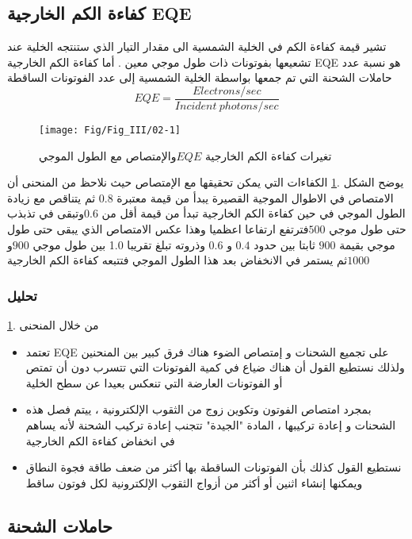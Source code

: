  \subsection{ كفاءة الكم الخارجية EQE }
 تشير قيمة كفاءة الكم في الخلية الشمسية الى مقدار التيار الذي ستنتجه الخلية عند تشعيعها بفوتونات ذات طول موجي معين . أما كفاءة الكم الخارجية  EQE هو نسبة عدد حاملات الشحنة التي تم جمعها بواسطة الخلية الشمسية إلى عدد الفوتونات الساقطة 
 \begin{equation}
 	 EQE=\frac{Electrons/sec}{Incident~ photons/sec}
 \end{equation}
 \begin{figure}[h!]
 	\centering
 	\texttt{[image: Fig/Fig\_III/02-1]}
 	\caption{تغيرات كفاءة الكم الخارجية $ EQE  $والإمتصاص مع الطول الموجي }
 	\label{fig:02-1}
 \end{figure}
 \FloatBarrier
 يوضح الشكل  .\ref{fig:02-1} الكفاءات التي يمكن تحقيقها مع الإمتصاص حيث نلاحظ من المنحنى أن الامتصاص في الاطوال الموجية القصيرة يبدأ من قيمة معتبرة $   0.8$ ثم يتناقص مع زيادة الطول الموجي في حين كفاءة الكم الخارجية تبدأ من قيمة أقل من $ 0.6  $وتبقى في تذبذب حتى طول موجي $ 500  $فترتفع ارتفاعا اعظميا وهذا عكس الامتصاص الذي يبقى حتى طول موجي بقيمة $ 900  $ ثابتا بين حدود  $ 0.4 $ و $ 0.6  $ وذروته تبلغ تقريبا 1.0 بين طول موجي $ 900  $و $ 1000  $ثم يستمر في الانخفاض بعد هذا الطول الموجي فتتبعه كفاءة الكم الخارجية  
 \subsubsection{  تحليل  }
  من خلال المنحنى  .\ref{fig:02-1}
 \begin{itemize}
 	\item      

 تعتمد EQE على تجميع الشحنات و إمتصاص الضوء هناك فرق كبير بين المنحنين ولذلك نستطيع القول أن هناك ضياع في كمية الفوتونات التي تتسرب دون أن تمتص  أو الفوتونات العارضة التي تنعكس بعيدا عن سطح الخلية  
 \item
 بمجرد امتصاص الفوتون وتكوين زوج من الثقوب الإلكترونية ، ييتم فصل هذه الشحنات و إعادة تركيبها ، المادة "الجيدة" تتجنب إعادة تركيب الشحنة لأنه يساهم في انخفاض كفاءة الكم الخارجية   
 \item 
   نستطيع القول كذلك بأن الفوتونات الساقطة بها أكثر من ضعف طاقة فجوة النطاق ويمكنها إنشاء اثنين أو أكثر من أزواج الثقوب الإلكترونية لكل فوتون  ساقط 
    \end{itemize}
   
 \subsection{   حاملات الشحنة   } 
 
